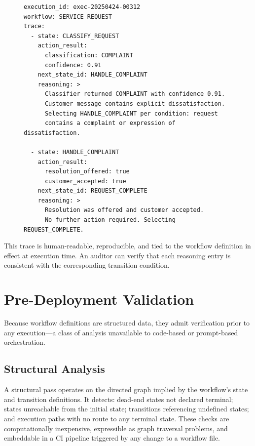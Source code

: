 \documentclass[10pt,conference]{IEEEtran}
\begin{document}
\begin{figure}[b]
\begin{tcolorbox}[codebox, title={Listing 2: Partial execution trace with mandatory reasoned transitions.}]
\begin{lstlisting}[style=yaml]
execution_id: exec-20250424-00312
workflow: SERVICE_REQUEST
trace:
  - state: CLASSIFY_REQUEST
    action_result:
      classification: COMPLAINT
      confidence: 0.91
    next_state_id: HANDLE_COMPLAINT
    reasoning: >
      Classifier returned COMPLAINT with confidence 0.91.
      Customer message contains explicit dissatisfaction.
      Selecting HANDLE_COMPLAINT per condition: request
      contains a complaint or expression of dissatisfaction.

  - state: HANDLE_COMPLAINT
    action_result:
      resolution_offered: true
      customer_accepted: true
    next_state_id: REQUEST_COMPLETE
    reasoning: >
      Resolution was offered and customer accepted.
      No further action required. Selecting REQUEST_COMPLETE.
\end{lstlisting}
\end{tcolorbox}
\label{lst:trace}
\end{figure}

This trace is human-readable, reproducible, and tied to the
workflow definition in effect at execution time.  An auditor can
verify that each reasoning entry is consistent with the
corresponding transition condition.


\section{Pre-Deployment Validation}
\label{sec:validation}

Because workflow definitions are structured data, they admit
verification prior to any execution---a class of analysis
unavailable to code-based or prompt-based orchestration.

\subsection{Structural Analysis}

A structural pass operates on the directed graph implied by the
workflow's state and transition definitions.  It detects:
dead-end states not declared terminal; states unreachable from
the initial state; transitions referencing undefined states; and
execution paths with no route to any terminal state.  These checks
are computationally inexpensive, expressible as graph traversal
problems, and embeddable in a CI pipeline triggered by any change
to a workflow file.
\end{document}
